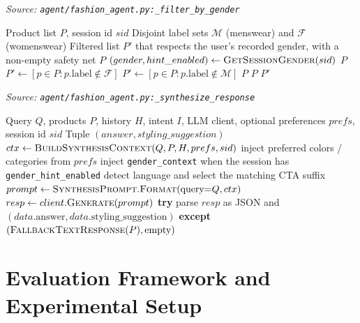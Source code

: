 \begin{algorithm}[H]
\caption{Filter Products by Recorded Session Gender}\label{alg:filter_gender}
\textit{Source: \texttt{agent/fashion\_agent.py:\_filter\_by\_gender}}
\begin{algorithmic}[1]
\Require Product list $P$, session id $sid$
\Require Disjoint label sets $\mathcal{M}$ (menswear) and $\mathcal{F}$ (womenswear)
\Ensure Filtered list $P'$ that respects the user's recorded gender, with a non-empty safety net
    \State \Return $P$\EndIf
    \State $(gender, hint\_enabled) \gets \textsc{GetSessionGender}(sid)$
    \State \Return $P$\EndIf
    \State $P' \gets [p \in P : p.\text{label} \notin \mathcal{F}]$
    \State $P' \gets [p \in P : p.\text{label} \notin \mathcal{M}]$
    \Else\State \Return $P$
    \EndIf
    \State \Return $P$ \EndIf
    \State \Return $P'$
\EndFunction
\end{algorithmic}
\end{algorithm}

\begin{algorithm}[H]
\caption{Synthesize the Final Response (Step 5)}\label{alg:synthesize_response}
\textit{Source: \texttt{agent/fashion\_agent.py:\_synthesize\_response}}
\begin{algorithmic}[1]
\Require Query $Q$, products $P$, history $H$, intent $I$, LLM client, optional preferences $prefs$, session id $sid$
\Ensure Tuple $(answer, styling\_suggestion)$
    \State $ctx \gets \textsc{BuildSynthesisContext}(Q, P, H, prefs, sid)$
    \Statex \quad inject preferred colors / categories from $prefs$
    \Statex \quad inject \texttt{gender\_context} when the session has \texttt{gender\_hint\_enabled}
    \Statex \quad detect language and select the matching CTA suffix
    \State $prompt \gets \textsc{SynthesisPrompt}.\textsc{Format}(\text{query}{=}Q, ctx)$
    \State $resp \gets client.\textsc{Generate}(prompt)$
    \State \textbf{try} parse $resp$ as JSON and \Return $(data.\text{answer}, data.\text{styling\_suggestion})$
    \State \textbf{except} \Return $(\textsc{FallbackTextResponse}(P), \text{empty})$
\EndFunction
\end{algorithmic}
\end{algorithm}

\section{Evaluation Framework and Experimental Setup}

